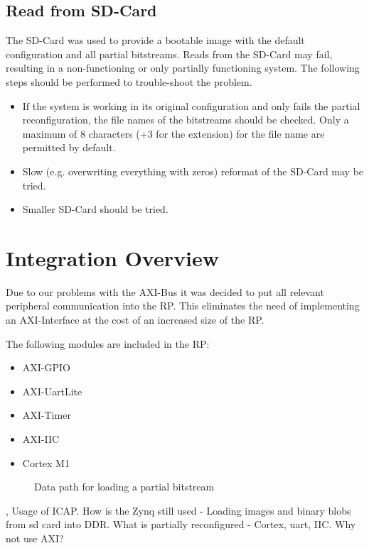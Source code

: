 \subsection{Read from SD-Card}
The SD-Card was used to provide a bootable image with the default configuration and all partial bitstreams.
Reads from the SD-Card may fail, resulting in a non-functioning or only partially functioning system.
The following steps should be performed to trouble-shoot the problem. 
\begin{itemize}
    \item If the system is working in its original configuration and only fails the partial reconfiguration, the file names of the bitstreams should be checked. Only a maximum of 8 characters (+3 for the extension) for the file name are permitted by default. 
    \item Slow (e.g. overwriting everything with zeros) reformat of the SD-Card may be tried.
    \item Smaller SD-Card should be tried.
\end{itemize}
\section{Integration Overview}
Due to our problems with the AXI-Bus it was decided to put all relevant peripheral communication into the \gls{RP}.
This eliminates the need of implementing an AXI-Interface at the cost of an increased size of the \gls{RP}.

The following modules are included in the \gls{RP}:
\begin{itemize}
    \item  AXI-GPIO
    \item  AXI-UartLite
    \item  AXI-Timer
    \item  AXI-IIC
    \item  Cortex M1
\end{itemize}

\begin{figure}[ht]
    \centering
{}
\caption{Data path for loading a partial bitstream}\label{fig:prIntegration}
\end{figure}
\cite{xilinx_vivado_2018-1}, \cite{xilinx_vivado_2018}
Usage of \gls{ICAP}.
How is the Zynq still used - Loading images and binary blobs from sd card into DDR.
What is partially reconfigured - Cortex, uart, IIC.
Why not use AXI?

